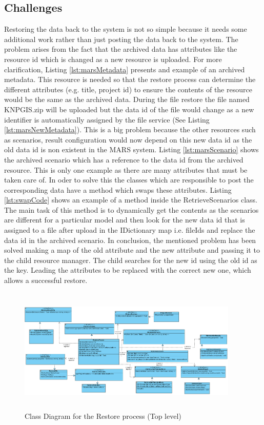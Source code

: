 \subsection{Challenges}
\label{subsec:restoreProb}
Restoring the data back to the system is not so simple because it needs some additional work rather than just posting the data back to the system. 
The problem arises from the fact that the archived data has attributes like the resource id which is changed as a new resource is uploaded. For more clarification, 
Listing \ref{lst:marsMetadata} presents and example of an archived metadata. This resource is needed so that the restore process can determine the different 
attributes (e.g. title, project id) to ensure the contents of the resource would be the same as the archived data. During the file restore 
the file named KNPGIS.zip will 
be uploaded but the data id of the file would change as a new identifier is automatically assigned by the file service (See Listing \ref{lst:marsNewMetadata}). 
This is a big problem because the other 
resources such as scenarios, result configuration would now
depend on this new data id as the old data id is non existent in the MARS system. Listing \ref{lst:marsScenario} shows the archived scenario which has a reference 
to the data id from the archived resource. 
This is only one example as there are many attributes that must be taken care of. In oder to solve this the classes which are responsible
to post the corresponding data have a method which swaps these attributes. Listing \ref{lst:swapCode} shows an example of a method inside the RetrieveScenarios class.
The main task of this method is to dynamically get the contents as the scenarios are different for a particular model and then look for the new data id
that is assigned to a file after upload in the IDictionary map i.e. fileIds and replace the data id in the archived scenario. In conclusion, the mentioned problem
has been solved making a map of the old attribute and the new attribute and passing it to the child resource manager. The child searches for the new id using the 
old id as the key. Leading the attributes to be replaced with the correct new one, which allows a successful restore.

\begin{figure}[H]
    \centering \includegraphics[height=6cm, angle=90, origin=c, width=10.5cm]{grafiken/restoreClass.png}
    \caption{Class Diagram for the Restore process (Top level)}
    \label{fig:restoreClass}
\end{figure}





